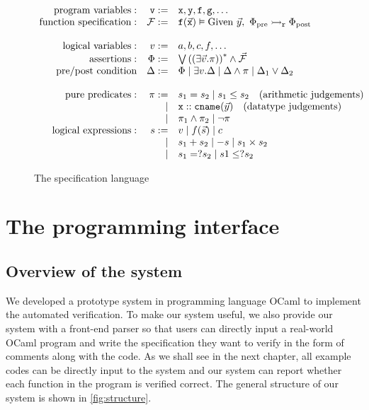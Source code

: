 \begin{figure}[htp]
$$\begin{array}{rrl}
    \text{program variables}: & \texttt{v} :=        
        & \texttt{x},\texttt{y},\texttt{f},\texttt{g},\ldots\\
    \text{function specification}: & \mathcal{F} := 
        & \texttt{f}(\vec{\texttt{x}}) \vDash \textrm{Given } \vec{y}, \  \Phi_{\text{pre}} \rightarrowtail_{\mathtt{r} } \Phi_{\text{post}} \\
    \\
    \text{logical variables}: & v := 
        & a, b,c, f, \ldots \\
    \text{assertions}: &\Phi := 
        & \bigvee \left((\exists \vec{v}. \pi)\right)^{*} \wedge \vec{\mathcal{F}} \\
    \text{pre/post condition} & \Delta := 
        & \Phi \mid \exists v. \Delta \mid \Delta \wedge \pi \mid \Delta_1 \vee \Delta_2 \\
    \\
    \text{pure predicates}: & \pi := 
        & s_1 = s_2 \mid s_1 \le s_2 \text{\quad (arithmetic judgements)} \\
    &\mid& \texttt{x}::\texttt{cname}(\vec{y}) \text{\quad (datatype judgements)} \\
    &\mid& \pi_1 \wedge \pi_2 \mid \neg \pi \\
    \text{logical expressions}: & s := 
        & v \mid f(\vec{s}) \mid c \\
    &\mid& s_1 + s_2 \mid - s \mid s_1 \times s_2 \\
    &\mid& s_1 =? s_2 \mid s1 \le? s_2
\end{array}$$
    \caption{The specification language}
    \label{fig:AssASTcur}
\end{figure}


\section{The programming interface}

\subsection{Overview of the system}

We developed a prototype system in programming language OCaml to implement the automated verification. To make our system useful, we also provide our system with a front-end parser so that users can directly input a real-world OCaml program and write the specification they want to verify in the form of comments along with the code. As we shall see in the next chapter, all example codes can be directly input to the system and our system can report whether each function in the program is verified correct. The general structure of our system is shown in \autoref{fig:structure}.

